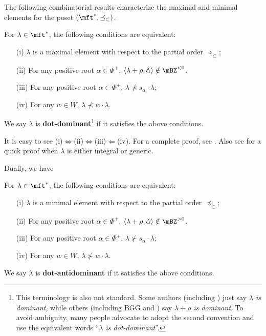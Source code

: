 	The following combinatorial results characterize the maximal and minimal elements for the poset $(\mft^*,\preceq_\subset)$. 

	\begin{propdefn}
		For $\lambda \in \mft^*$, the following conditions are equivalent:
		\begin{itemize}
			\item[(i)]
				$\lambda$ is a maximal element with respect to the partial order $\preceq_\subset$;
			\item[(ii)]
				For any positive root $\alpha\in \Phi^+$, $\langle \lambda+\rho, \check\alpha \rangle \notin \mBZ^{< 0}$.
			\item[(iii)]
				For any positive root $\alpha\in \Phi^+$, $\lambda \nprec s_\alpha \cdot \lambda$;
			\item[(iv)]
				For any $w\in W$, $\lambda \nprec w \cdot \lambda$.
		\end{itemize}
		We say $\lambda$ is \textbf{dot-dominant}\footnote{This terminology is also not standard. Some authors (including \cite{H}) just say \emph{$\lambda$ is dominant}, while others (including BGG and \cite{G}) say \emph{$\lambda+\rho$ is dominant}. To avoid ambiguity, many people advocate to adopt the second convention and use the equivalent words ``\emph{$\lambda$ is dot-dominant}''.} if it satisfies the above conditions.
	\end{propdefn}

	It is easy to see (i)$\Leftrightarrow$(ii)$\Leftrightarrow$(iii)$\Leftarrow$(iv). For a complete proof, see \cite[Sect. 3.4-3.5]{H}. Also see \cite[Sect. 3.7]{G} for a quick proof when $\lambda$ is either integral or generic.
	
	Dually, we have
	\begin{propdefn}
		For $\lambda \in \mft^*$, the following conditions are equivalent:
		\begin{itemize}
			\item[(i)]
				$\lambda$ is a minimal element with respect to the partial order $\preceq_\subset$;
			\item[(ii)]
				For any positive root $\alpha\in \Phi^+$, $\langle \lambda+\rho, \check\alpha \rangle \notin \mBZ^{> 0}$.
			\item[(iii)]
				For any positive root $\alpha\in \Phi^+$, $\lambda \nsucc s_\alpha \cdot \lambda$;
			\item[(iv)]
				For any $w\in W$, $\lambda \nsucc w \cdot \lambda$.
		\end{itemize}
		We say $\lambda$ is \textbf{dot-antidominant} if it satisfies the above conditions.
	\end{propdefn}

